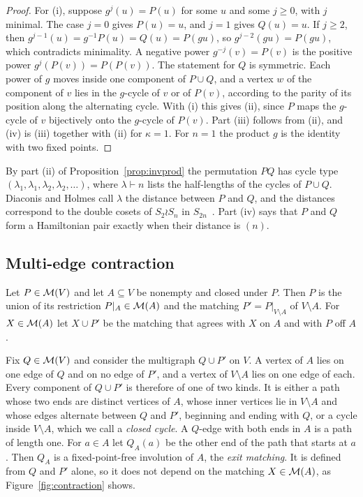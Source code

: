 \begin{proof}
For (i), suppose $g^j(u)=P(u)$ for some $u$ and some $j\ge0$, with $j$ minimal. The case $j=0$ gives $P(u)=u$, and $j=1$ gives $Q(u)=u$. If $j\ge2$, then $g^{j-1}(u)=g^{-1}P(u)=Q(u)=P(gu)$, so $g^{j-2}(gu)=P(gu)$, which contradicts minimality. A negative power $g^{-j}(v)=P(v)$ is the positive power $g^{j}(P(v))=P(P(v))$. The statement for $Q$ is symmetric. Each power of $g$ moves inside one component of $P\cup Q$, and a vertex $w$ of the component of $v$ lies in the $g$-cycle of $v$ or of $P(v)$, according to the parity of its position along the alternating cycle. With (i) this gives (ii), since $P$ maps the $g$-cycle of $v$ bijectively onto the $g$-cycle of $P(v)$. Part (iii) follows from (ii), and (iv) is (iii) together with (ii) for $\kappa=1$. For $n=1$ the product $g$ is the identity with two fixed points.
\end{proof}

By part (ii) of Proposition~\ref{prop:invprod} the permutation $PQ$ has cycle type $(\lambda_1,\lambda_1,\lambda_2,\lambda_2,\dots)$, where $\lambda\vdash n$ lists the half-lengths of the cycles of $P\cup Q$. Diaconis and Holmes call $\lambda$ the distance between $P$ and $Q$, and the distances correspond to the double cosets of $S_2\wr S_n$ in $S_{2n}$~\cite[\S1.5]{DH02}. Part (iv) says that $P$ and $Q$ form a Hamiltonian pair exactly when their distance is $(n)$.

\subsection{Multi-edge contraction}\label{subsec:contraction}

Let $P\in\mathcal{M}(V)$ and let $A\subseteq V$ be nonempty and closed under $P$. Then $P$ is the union of its restriction $P|_A\in\mathcal{M}(A)$ and the matching $P'=P|_{V\setminus A}$ of $V\setminus A$. For $X\in\mathcal{M}(A)$ let $X\cup P'$ be the matching that agrees with $X$ on $A$ and with $P$ off $A$.

Fix $Q\in\mathcal{M}(V)$ and consider the multigraph $Q\cup P'$ on $V$. A vertex of $A$ lies on one edge of $Q$ and on no edge of $P'$, and a vertex of $V\setminus A$ lies on one edge of each. Every component of $Q\cup P'$ is therefore of one of two kinds. It is either a path whose two ends are distinct vertices of $A$, whose inner vertices lie in $V\setminus A$ and whose edges alternate between $Q$ and $P'$, beginning and ending with $Q$, or a cycle inside $V\setminus A$, which we call a \emph{closed cycle}. A $Q$-edge with both ends in $A$ is a path of length one. For $a\in A$ let $Q_A(a)$ be the other end of the path that starts at $a$. Then $Q_A$ is a fixed-point-free involution of $A$, the \emph{exit matching}. It is defined from $Q$ and $P'$ alone, so it does not depend on the matching $X\in\mathcal{M}(A)$, as Figure~\ref{fig:contraction} shows.

